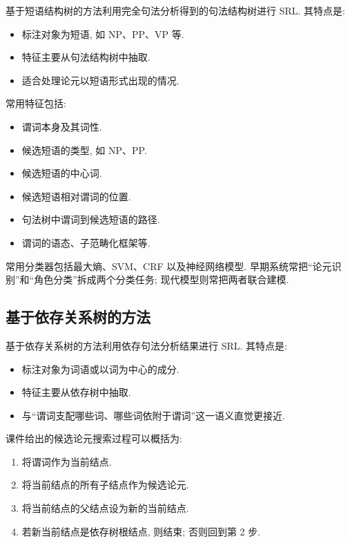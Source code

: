 基于短语结构树的方法利用完全句法分析得到的句法结构树进行 SRL.
其特点是:

\begin{itemize}
\item 标注对象为短语, 如 NP、PP、VP 等.
\item 特征主要从句法结构树中抽取.
\item 适合处理论元以短语形式出现的情况.
\end{itemize}

常用特征包括:

\begin{itemize}
\item 谓词本身及其词性.
\item 候选短语的类型, 如 NP、PP.
\item 候选短语的中心词.
\item 候选短语相对谓词的位置.
\item 句法树中谓词到候选短语的路径.
\item 谓词的语态、子范畴化框架等.
\end{itemize}

常用分类器包括最大熵、SVM、CRF 以及神经网络模型.
早期系统常把“论元识别”和“角色分类”拆成两个分类任务;
现代模型则常把两者联合建模.

\subsection{基于依存关系树的方法}


基于依存关系树的方法利用依存句法分析结果进行 SRL.
其特点是:

\begin{itemize}
\item 标注对象为词语或以词为中心的成分.
\item 特征主要从依存树中抽取.
\item 与“谓词支配哪些词、哪些词依附于谓词”这一语义直觉更接近.
\end{itemize}

课件给出的候选论元搜索过程可以概括为:

\begin{enumerate}
\item[1.] 将谓词作为当前结点.
\item[2.] 将当前结点的所有子结点作为候选论元.
\item[3.] 将当前结点的父结点设为新的当前结点.
\item[4.] 若新当前结点是依存树根结点, 则结束; 否则回到第 2 步.
\end{enumerate}

